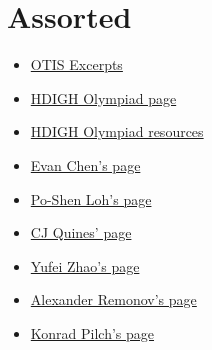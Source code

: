 \section{Assorted}
\begin{itemize}
  \item \href{https://web.evanchen.cc/textbooks/OTIS-Excerpts.pdf}{OTIS
      Excerpts}
  \item
    \href{https://web.archive.org/web/20220102030159/https://how-did-i-get-here.com/olympiad/}{HDIGH Olympiad page}
  \item
    \href{https://web.archive.org/web/20220102030357/https://how-did-i-get-here.com/olympiad-resources/}{HDIGH Olympiad
      resources}
  \item \href{https://web.evanchen.cc/olympiad.html}{Evan Chen's page}
  \item \href{https://www.math.cmu.edu/~ploh/olympiad.shtml}{Po-Shen Loh's page}
  \item \href{https://cjquines.com/math/competition-handouts}{CJ Quines' page}
  \item \href{https://yufeizhao.com/olympiad/}{Yufei Zhao's page}
  \item \href{https://alexanderrem.weebly.com/math-competitions.html}{Alexander
      Remonov's page}
  \item \href{https://www.its.caltech.edu/~kpilch/olympiad.html}{Konrad Pilch's
      page}
\end{itemize}
